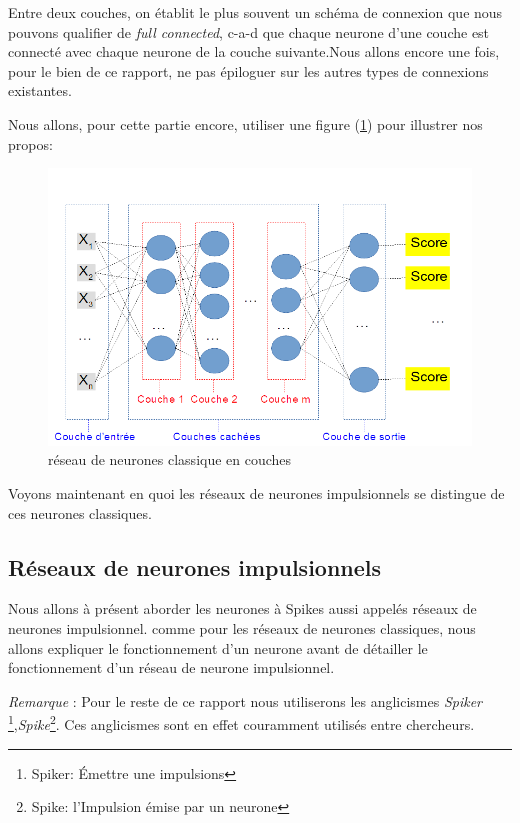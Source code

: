 Entre deux couches, on établit le plus souvent un schéma de connexion que nous pouvons qualifier de \textit{full connected}, c-a-d que chaque neurone d'une couche est connecté avec chaque neurone de la couche suivante.Nous allons encore une fois, pour le bien de ce rapport, ne pas épiloguer sur les autres types de connexions existantes.\newline

Nous allons, pour cette partie encore, utiliser une figure (\ref{reseauClassique}) pour illustrer nos propos:

\begin{figure}[h]
\includegraphics[width=16.5cm]{./images/multicouche.png}
\caption{réseau de neurones classique en couches}
\label{reseauClassique}
\end{figure}

Voyons maintenant en quoi les réseaux de neurones impulsionnels se distingue de ces neurones classiques.

\subsection{Réseaux de neurones impulsionnels}
\label{SNN}

Nous allons à présent aborder les neurones à Spikes aussi appelés réseaux de neurones impulsionnel. comme pour les réseaux de neurones classiques, nous allons expliquer le fonctionnement d'un neurone avant de détailler le fonctionnement d'un réseau de neurone impulsionnel.

\textit{Remarque} : Pour le reste de ce rapport nous utiliserons les anglicismes \textit{Spiker} \footnote{Spiker: Émettre une impulsions},\textit{Spike}\footnote{Spike: l'Impulsion émise par un neurone}.
Ces anglicismes sont en effet couramment utilisés entre chercheurs.

